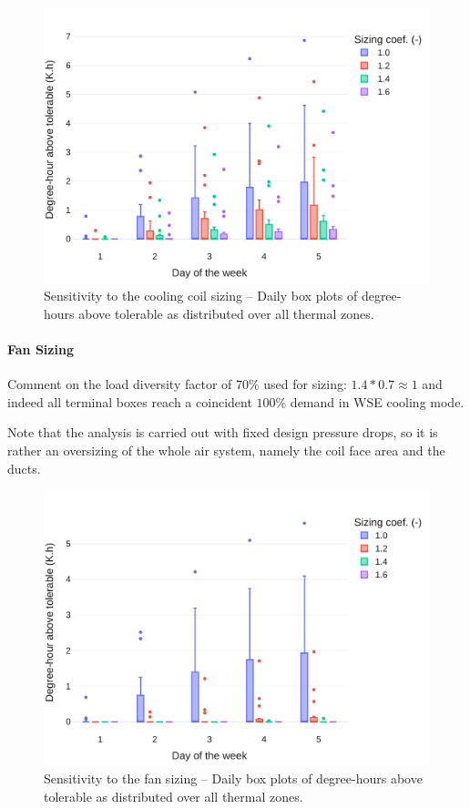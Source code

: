 \begin{figure}[!htbp]
\centering
\includegraphics[width=.7\linewidth]{../python_scripts/figures/CoilSizing.pdf}
\caption{Sensitivity to the cooling coil sizing -- Daily box plots of degree-hours above tolerable as distributed over all thermal zones.}
\label{fig:coil}
\end{figure}

\paragraph{Fan Sizing} \label{par:fan}

Comment on the load diversity factor of $70\%$ used for sizing:
$1.4 * 0.7 \approx 1$ and indeed all terminal boxes reach a coincident $100\%$ demand in WSE cooling mode.

Note that the analysis is carried out with fixed design pressure drops, so it is rather an oversizing of the whole air system, namely the coil face area and the ducts.


\begin{figure}[!htbp]
\centering
\includegraphics[width=.7\linewidth]{../python_scripts/figures/FanSizing.pdf}
\caption{Sensitivity to the fan sizing -- Daily box plots of degree-hours above tolerable as distributed over all thermal zones.}
\label{fig:fan}
\end{figure}



